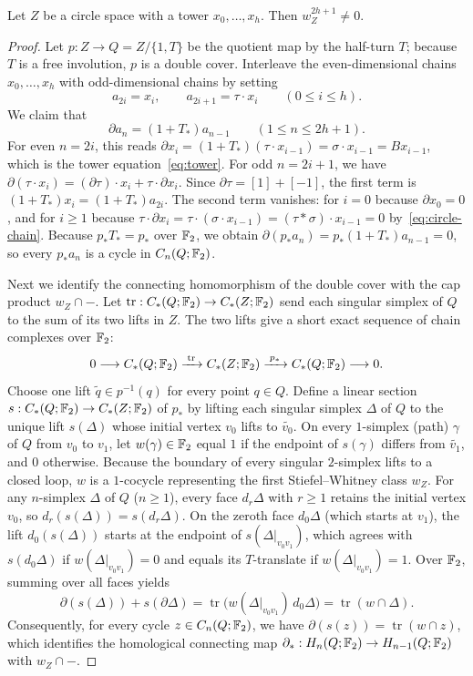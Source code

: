 \begin{lemma}\label{lem:tower-detection}
Let $Z$ be a circle space with a tower $x_0,\ldots,x_h$. Then $w_Z^{2h+1}\ne0$.
\end{lemma}
\begin{proof}
Let $p:Z\to Q=Z/\{1,T\}$ be the quotient map by the half-turn $T$; because $T$ is a free involution, $p$ is a double cover. Interleave the even-dimensional chains $x_0,\ldots,x_h$ with odd-dimensional chains by setting
\[
 a_{2i}=x_i,\qquad a_{2i+1}=\tau\cdot x_i\qquad (0\le i\le h).
\]
We claim that
\[
 \partial a_n=(1+T_*)a_{n-1}\qquad (1\le n\le 2h+1).
\]
For even $n=2i$, this reads $\partial x_i=(1+T_*)(\tau\cdot x_{i-1})=\sigma\cdot x_{i-1}=Bx_{i-1}$, which is the tower equation~\eqref{eq:tower}. For odd $n=2i+1$, we have $\partial(\tau\cdot x_i)=(\partial\tau)\cdot x_i+\tau\cdot\partial x_i$. Since $\partial\tau=[1]+[-1]$, the first term is $(1+T_*)x_i=(1+T_*)a_{2i}$. The second term vanishes: for $i=0$ because $\partial x_0=0$, and for $i\ge1$ because $\tau\cdot\partial x_i=\tau\cdot(\sigma\cdot x_{i-1})=(\tau*\sigma)\cdot x_{i-1}=0$ by~\eqref{eq:circle-chain}. Because $p_*T_*=p_*$ over $\mathbb F_2$, we obtain $\partial(p_*a_n)=p_*(1+T_*)a_{n-1}=0$, so every $p_*a_n$ is a cycle in $C_n(Q;\mathbb F_2)$.

Next we identify the connecting homomorphism of the double cover with the cap product $w_Z\cap-$. Let $\operatorname{tr}:C_*(Q;\mathbb F_2)\to C_*(Z;\mathbb F_2)$ send each singular simplex of $Q$ to the sum of its two lifts in $Z$. The two lifts give a short exact sequence of chain complexes over $\mathbb F_2$:
\[
 0\longrightarrow C_*(Q;\mathbb F_2)\xrightarrow{\;\operatorname{tr}\;} C_*(Z;\mathbb F_2)\xrightarrow{\;p_*\;} C_*(Q;\mathbb F_2)\longrightarrow 0.
\]
Choose one lift $\tilde q\in p^{-1}(q)$ for every point $q\in Q$. Define a linear section $s:C_*(Q;\mathbb F_2)\to C_*(Z;\mathbb F_2)$ of $p_*$ by lifting each singular simplex $\Delta$ of $Q$ to the unique lift $s(\Delta)$ whose initial vertex $v_0$ lifts to $\widetilde{v_0}$. On every $1$-simplex (path) $\gamma$ of $Q$ from $v_0$ to $v_1$, let $w(\gamma)\in\mathbb F_2$ equal $1$ if the endpoint of $s(\gamma)$ differs from $\widetilde{v_1}$, and $0$ otherwise. Because the boundary of every singular $2$-simplex lifts to a closed loop, $w$ is a $1$-cocycle representing the first Stiefel--Whitney class $w_Z$. For any $n$-simplex $\Delta$ of $Q$ ($n\ge1$), every face $d_r\Delta$ with $r\ge1$ retains the initial vertex $v_0$, so $d_r(s(\Delta))=s(d_r\Delta)$. On the zeroth face $d_0\Delta$ (which starts at $v_1$), the lift $d_0(s(\Delta))$ starts at the endpoint of $s(\Delta|_{v_0v_1})$, which agrees with $s(d_0\Delta)$ if $w(\Delta|_{v_0v_1})=0$ and equals its $T$-translate if $w(\Delta|_{v_0v_1})=1$. Over $\mathbb F_2$, summing over all faces yields
\[
 \partial(s(\Delta))+s(\partial\Delta)=\operatorname{tr}\bigl(w(\Delta|_{v_0v_1})\,d_0\Delta\bigr)=\operatorname{tr}(w\cap\Delta).
\]
Consequently, for every cycle $z\in C_n(Q;\mathbb F_2)$, we have $\partial(s(z))=\operatorname{tr}(w\cap z)$, which identifies the homological connecting map $\partial_*:H_n(Q;\mathbb F_2)\to H_{n-1}(Q;\mathbb F_2)$ with $w_Z\cap-$.


\end{proof}
